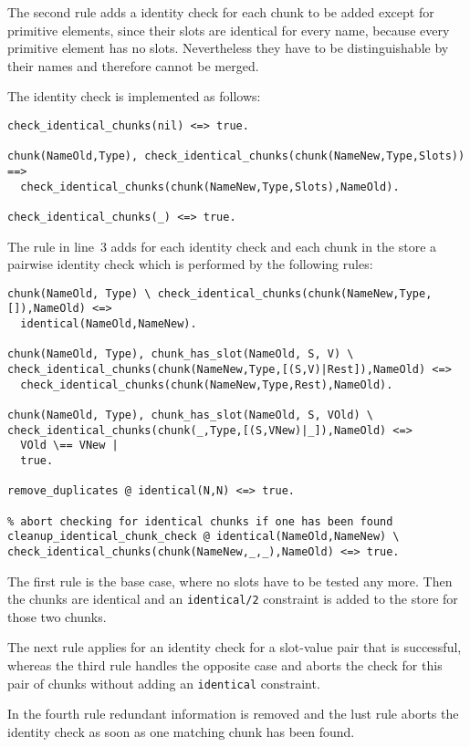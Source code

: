 The second rule adds a identity check for each chunk to be added except for primitive elements, since their slots are identical for every name, because every primitive element has no slots. Nevertheless they have to be distinguishable by their names and therefore cannot be merged.

The identity check is implemented as follows:

\begin{lstlisting}
check_identical_chunks(nil) <=> true.

chunk(NameOld,Type), check_identical_chunks(chunk(NameNew,Type,Slots)) ==> 
  check_identical_chunks(chunk(NameNew,Type,Slots),NameOld).
  
check_identical_chunks(_) <=> true.
\end{lstlisting}

The rule in line~3 adds for each identity check and each chunk in the store a pairwise identity check which is performed by the following rules:

\begin{lstlisting}
chunk(NameOld, Type) \ check_identical_chunks(chunk(NameNew,Type,[]),NameOld) <=> 
  identical(NameOld,NameNew).
  
chunk(NameOld, Type), chunk_has_slot(NameOld, S, V) \ check_identical_chunks(chunk(NameNew,Type,[(S,V)|Rest]),NameOld) <=> 
  check_identical_chunks(chunk(NameNew,Type,Rest),NameOld).
  
chunk(NameOld, Type), chunk_has_slot(NameOld, S, VOld) \ check_identical_chunks(chunk(_,Type,[(S,VNew)|_]),NameOld) <=> 
  VOld \== VNew |
  true.
    
remove_duplicates @ identical(N,N) <=> true.

% abort checking for identical chunks if one has been found
cleanup_identical_chunk_check @ identical(NameOld,NameNew) \ check_identical_chunks(chunk(NameNew,_,_),NameOld) <=> true.
\end{lstlisting}

The first rule is the base case, where no slots have to be tested any more. Then the chunks are identical and an \verb|identical/2| constraint is added to the store for those two chunks.

The next rule applies for an identity check for a slot-value pair that is successful, whereas the third rule handles the opposite case and aborts the check for this pair of chunks without adding an \verb|identical| constraint.

In the fourth rule redundant information is removed and the lust rule aborts the identity check as soon as one matching chunk has been found.

